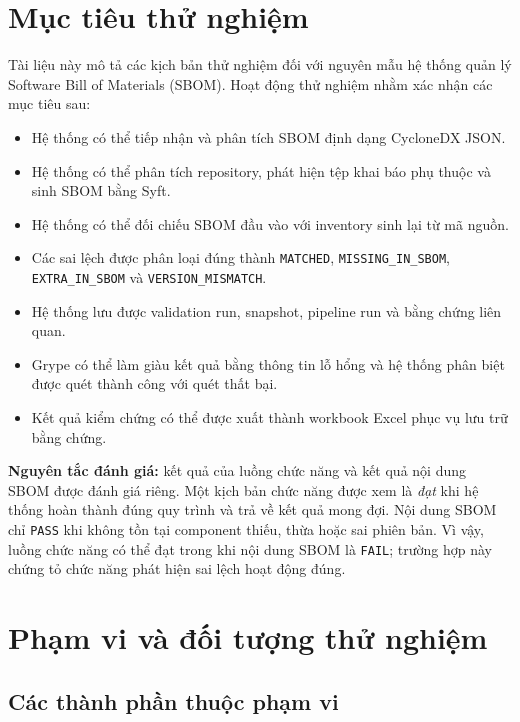 \documentclass[12pt,a4paper]{article}
\newcommand{\code}[1]{\texttt{#1}}
\begin{document}
\section{Mục tiêu thử nghiệm}

Tài liệu này mô tả các kịch bản thử nghiệm đối với nguyên mẫu hệ thống quản lý
Software Bill of Materials (SBOM). Hoạt động thử nghiệm nhằm xác nhận các mục tiêu sau:

\begin{itemize}
  \item Hệ thống có thể tiếp nhận và phân tích SBOM định dạng CycloneDX JSON.
  \item Hệ thống có thể phân tích repository, phát hiện tệp khai báo phụ thuộc và sinh SBOM bằng Syft.
  \item Hệ thống có thể đối chiếu SBOM đầu vào với inventory sinh lại từ mã nguồn.
  \item Các sai lệch được phân loại đúng thành \code{MATCHED},
        \code{MISSING\_IN\_SBOM}, \code{EXTRA\_IN\_SBOM} và
        \code{VERSION\_MISMATCH}.
  \item Hệ thống lưu được validation run, snapshot, pipeline run và bằng chứng liên quan.
  \item Grype có thể làm giàu kết quả bằng thông tin lỗ hổng và hệ thống phân biệt được
        quét thành công với quét thất bại.
  \item Kết quả kiểm chứng có thể được xuất thành workbook Excel phục vụ lưu trữ bằng chứng.
\end{itemize}

\textbf{Nguyên tắc đánh giá:} kết quả của luồng chức năng và kết quả nội dung SBOM
được đánh giá riêng. Một kịch bản chức năng được xem là \emph{đạt} khi hệ thống hoàn
thành đúng quy trình và trả về kết quả mong đợi. Nội dung SBOM chỉ \code{PASS} khi
không tồn tại component thiếu, thừa hoặc sai phiên bản. Vì vậy, luồng chức năng có
thể đạt trong khi nội dung SBOM là \code{FAIL}; trường hợp này chứng tỏ chức năng
phát hiện sai lệch hoạt động đúng.

\section{Phạm vi và đối tượng thử nghiệm}

\subsection{Các thành phần thuộc phạm vi}
\end{document}
